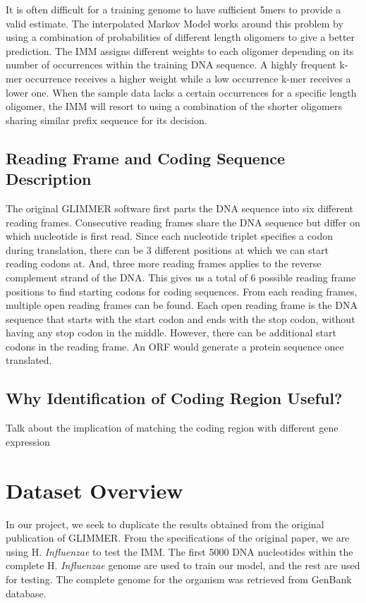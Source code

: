 \documentclass[11pt,letterpaper]{article}
\begin{document}
It is often difficult for a training genome to have sufficient 5mers to provide a valid estimate. The interpolated Markov Model works around this problem by using a combination of probabilities of different length oligomers to give a better prediction. The IMM assigns different weights to each oligomer depending on its number of occurrences within the training DNA sequence. A highly frequent k-mer occurrence receives a higher weight while a low occurrence k-mer receives a lower one. When the sample data lacks a certain occurrences for a specific length oligomer, the IMM will resort to using a combination of the shorter oligomers sharing similar prefix sequence for its decision. 


\subsection{Reading Frame and Coding Sequence Description}

The original GLIMMER software first parts the DNA sequence into six different reading frames. Consecutive reading frames share the DNA sequence but differ on which nucleotide is first read. Since each nucleotide triplet specifies a codon during translation, there can be 3 different positions at which we can start reading codons at. And, three more reading frames applies to the reverse complement strand of the DNA. This gives us a total of 6 possible reading frame positions to find starting codons for coding sequences. 
From each reading frames, multiple open reading frames can be found. Each open reading frame is the DNA sequence that starts with the start codon and ends with the stop codon, without having any stop codon in the middle. However, there can be additional start codons in the reading frame. An ORF would generate a protein sequence once translated. 

\subsection{Why Identification of Coding Region Useful?}

Talk about the implication of matching the coding region with different gene expression

\section{Dataset Overview}

In our project, we seek to duplicate the results obtained from the original publication of GLIMMER. From the specifications of the original paper, we are using H. \emph{Influenzae} to test the IMM. The first 5000 DNA nucleotides within the complete H. \emph{Influenzae} genome are used to train our model, and the rest are used for testing. The complete genome for the organism was retrieved from GenBank database.
\end{document}
